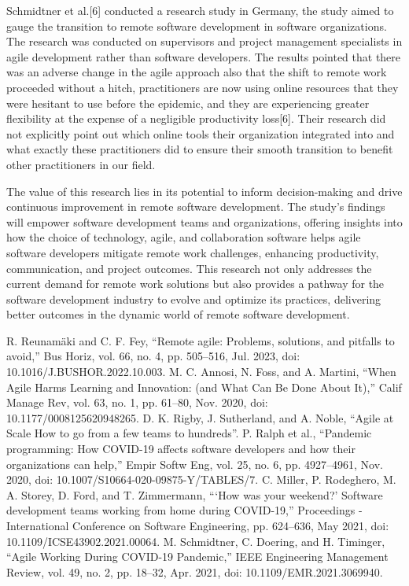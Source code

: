 \documentclass[conference]{IEEEtran}
\begin{document}
Schmidtner et al.[6] conducted a research study in Germany, the study aimed to gauge the transition to remote software development in software organizations. The research was conducted on supervisors and project management specialists in agile development rather than software developers. The results pointed that there was an adverse change in the agile approach also that the shift to remote work proceeded without a hitch, practitioners are now using online resources that they were hesitant to use before the epidemic, and they are experiencing greater flexibility at the expense of a negligible productivity loss[6]. Their research did not explicitly point out which online tools their organization integrated into and what exactly these practitioners did to ensure their smooth transition to benefit other practitioners in our field.

The value of this research lies in its potential to inform decision-making and drive continuous improvement in remote software development. The study's findings will empower software development teams and organizations, offering insights into how the choice of technology, agile, and collaboration software helps agile software developers mitigate remote work challenges, enhancing productivity, communication, and project outcomes. This research not only addresses the current demand for remote work solutions but also provides a pathway for the software development industry to evolve and optimize its practices, delivering better outcomes in the dynamic world of remote software development.


\begin{thebibliography}{00}
     R. Reunamäki and C. F. Fey, “Remote agile: Problems, solutions, and pitfalls to avoid,” Bus Horiz, vol. 66, no. 4, pp. 505–516, Jul. 2023, doi: 10.1016/J.BUSHOR.2022.10.003. 
     M. C. Annosi, N. Foss, and A. Martini, “When Agile Harms Learning and Innovation: (and What Can Be Done About It),” Calif Manage Rev, vol. 63, no. 1, pp. 61–80, Nov. 2020, doi: 10.1177/0008125620948265. 
     D. K. Rigby, J. Sutherland, and A. Noble, “Agile at Scale How to go from a few teams to hundreds”.
     P. Ralph et al., “Pandemic programming: How COVID-19 affects software developers and how their organizations can help,” Empir Softw Eng, vol. 25, no. 6, pp. 4927–4961, Nov. 2020, doi: 10.1007/S10664-020-09875-Y/TABLES/7.
     C. Miller, P. Rodeghero, M. A. Storey, D. Ford, and T. Zimmermann, “‘How was your weekend?’ Software development teams working from home during COVID-19,” Proceedings - International Conference on Software Engineering, pp. 624–636, May 2021, doi: 10.1109/ICSE43902.2021.00064. 
     M. Schmidtner, C. Doering, and H. Timinger, “Agile Working During COVID-19 Pandemic,” IEEE Engineering Management Review, vol. 49, no. 2, pp. 18–32, Apr. 2021, doi: 10.1109/EMR.2021.3069940.
\end{thebibliography}
\end{document}
